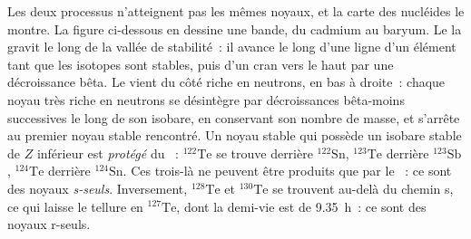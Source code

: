 Les deux processus n'atteignent pas les mêmes noyaux, et la carte des nucléides
le montre. La figure ci-dessous en dessine une bande, du cadmium au
baryum. Le  la gravit le long de la vallée de stabilité~: il avance le long d'une
ligne d'un élément tant que les isotopes sont stables, puis d'un cran vers le haut par une
décroissance bêta. Le  vient du côté riche en neutrons, en bas
à droite~: chaque noyau très riche en neutrons se désintègre par décroissances bêta-moins successives
le long de son isobare, en conservant son nombre de masse, et s'arrête au premier
noyau stable rencontré. Un noyau stable qui possède un isobare stable de
$Z$ inférieur est \emph{protégé} du ~: $^{122}\mathrm{Te}$
se trouve derrière $^{122}\mathrm{Sn}$, $^{123}\mathrm{Te}$ derrière
$^{123}\mathrm{Sb}$, $^{124}\mathrm{Te}$ derrière $^{124}\mathrm{Sn}$.
Ces trois-là ne peuvent être produits que par le ~: ce sont des
noyaux \emph{s-seuls}. Inversement, $^{128}\mathrm{Te}$ et $^{130}\mathrm{Te}$
se trouvent au-delà du chemin s, ce qui laisse le tellure en $^{127}\mathrm{Te}$,
dont la demi-vie est de \qty{9.35}{h}~: ce sont des noyaux r-seuls.

